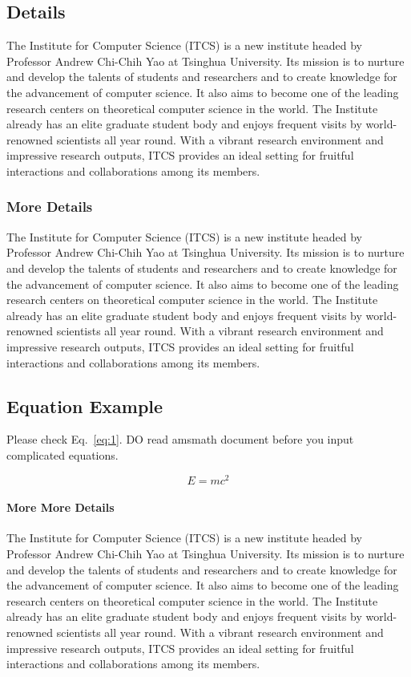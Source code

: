 \documentclass{ics}
\begin{document}
\subsection{Details}
\label{sec:details}
The Institute for Computer Science (ITCS) is a new institute headed by Professor
Andrew Chi-Chih Yao at Tsinghua University. Its mission is to nurture and
develop the talents of students and researchers and to create knowledge for the
advancement of computer science. It also aims to become one of the leading
research centers on theoretical computer science in the world. The Institute
already has an elite graduate student body and enjoys frequent visits by
world-renowned scientists all year round. With a vibrant research environment
and impressive research outputs, ITCS provides an ideal setting for fruitful
interactions and collaborations among its members.

\subsubsection{More Details}
\label{sec:more-details}
The Institute for Computer Science (ITCS) is a new institute headed by Professor
Andrew Chi-Chih Yao at Tsinghua University. Its mission is to nurture and
develop the talents of students and researchers and to create knowledge for the
advancement of computer science. It also aims to become one of the leading
research centers on theoretical computer science in the world. The Institute
already has an elite graduate student body and enjoys frequent visits by
world-renowned scientists all year round. With a vibrant research environment
and impressive research outputs, ITCS provides an ideal setting for fruitful
interactions and collaborations among its members.

\subsection{Equation Example}
\label{sec:equation-example}
Please check Eq.~\eqref{eq:1}. DO read \textsf{amsmath} document before you
input complicated equations.

\begin{equation}
  \label{eq:1}
  E=mc^{2}
\end{equation}

\paragraph{More More Details}
\label{sec:more-more-details}
The Institute for Computer Science (ITCS) is a new institute headed by Professor
Andrew Chi-Chih Yao at Tsinghua University. Its mission is to nurture and
develop the talents of students and researchers and to create knowledge for the
advancement of computer science. It also aims to become one of the leading
research centers on theoretical computer science in the world. The Institute
already has an elite graduate student body and enjoys frequent visits by
world-renowned scientists all year round. With a vibrant research environment
and impressive research outputs, ITCS provides an ideal setting for fruitful
interactions and collaborations among its members.
\end{document}

